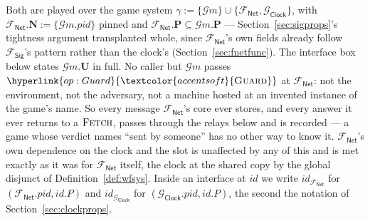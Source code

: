 \documentclass[10pt,oneside,openany]{book}
\newcommand{\Ps}{\mathbf{P}}
\newcommand{\PID}{\mathit{pid}}
\newcommand{\admits}{\mathbf{N}}
\newcommand{\uses}{\mathbf{U}}
\newcommand{\op}[1]{\textnormal{\textsc{#1}}}
\newcommand{\opl}[1]{\hyperlink{op:#1}{\textcolor{accentsoft}{\op{#1}}}}
\newcommand{\id}{id}
\newcommand{\Gm}{\mathcal{G}m}
\newcommand{\Fsig}{\mathcal{F}_{\mathsf{Sig}}}
\newcommand{\Gclock}{\mathcal{G}_{\mathsf{Clock}}}
\newcommand{\Fnet}{\mathcal{F}_{\mathsf{Net}}}
\theoremstyle{accentdef}
\theoremstyle{accentplain}
\begin{document}
Both are played over the game system $\gamma := \{\Gm\} \cup \{\Fnet,\Gclock\}$, with
$\Fnet.\admits := \{\Gm.\PID\}$ pinned and $\Fnet.\Ps \subseteq \Gm.\Ps$ ---
Section~\ref{sec:sigprops}'s tightness argument transplanted whole, since $\Fnet$'s own fields
already follow $\Fsig$'s pattern rather than the clock's (Section~\ref{sec:fnetfunc}). The
interface box below states $\Gm.\uses$ in full. No caller but $\Gm$ passes $\opl{Guard}$ at $\Fnet$: not the
environment, not the adversary, not a machine hosted at an invented instance of the game's name.
So every message $\Fnet$'s core ever stores, and every answer it ever returns to a $\op{Fetch}$,
passes through the relays below and is recorded --- a game whose verdict names ``sent by someone''
has no other way to know it. $\Fnet$'s own dependence on the clock and the slot is unaffected by
any of this and is met exactly as it was for $\Fnet$ itself, the clock at the shared copy by the
global disjunct of Definition~\ref{def:wfsys}. Inside an interface at $\id$ we write $\id_{\Fnet}$
for $(\Fnet.\PID,\id.P)$ and $\id_{\Gclock}$ for $(\Gclock.\PID,\id.P)$, the second the notation of
Section~\ref{sec:clockprops}.
\end{document}
